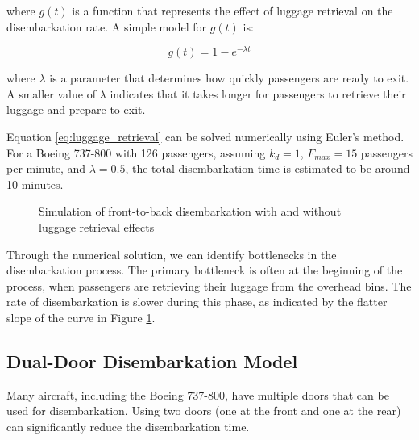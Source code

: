 where $g(t)$ is a function that represents the effect of luggage retrieval on the disembarkation rate. A simple model for $g(t)$ is:

\begin{equation}
g(t) = 1 - e^{-\lambda t}
\label{eq:retrieval_factor}
\end{equation}

where $\lambda$ is a parameter that determines how quickly passengers are ready to exit. A smaller value of $\lambda$ indicates that it takes longer for passengers to retrieve their luggage and prepare to exit.

Equation \ref{eq:luggage_retrieval} can be solved numerically using Euler's method. For a Boeing 737-800 with 126 passengers, assuming $k_d = 1$, $F_{max} = 15$ passengers per minute, and $\lambda = 0.5$, the total disembarkation time is estimated to be around 10 minutes.

\begin{figure}[H]
\centering
{}
\caption{Simulation of front-to-back disembarkation with and without luggage retrieval effects}
\label{fig:front_to_back}
\end{figure}

Through the numerical solution, we can identify bottlenecks in the disembarkation process. The primary bottleneck is often at the beginning of the process, when passengers are retrieving their luggage from the overhead bins. The rate of disembarkation is slower during this phase, as indicated by the flatter slope of the curve in Figure \ref{fig:front_to_back}.

\subsection{Dual-Door Disembarkation Model}

Many aircraft, including the Boeing 737-800, have multiple doors that can be used for disembarkation. Using two doors (one at the front and one at the rear) can significantly reduce the disembarkation time.

